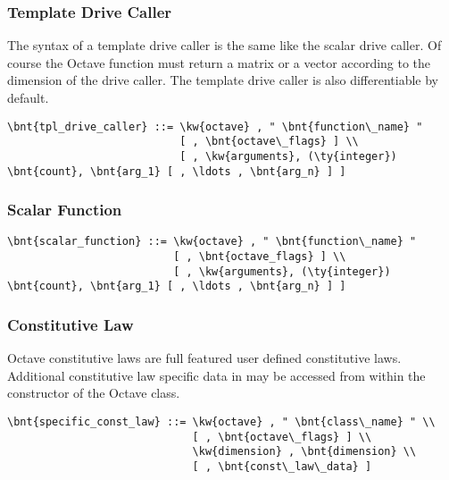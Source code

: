 \subsubsection{Template Drive Caller}
The syntax of a template drive caller is the same like the scalar drive caller. Of course the Octave function must return a matrix or a vector according to the dimension of the drive caller. The template drive caller is also differentiable by default.
\begin{Verbatim}[commandchars=\\\{\}]
    \bnt{tpl_drive_caller} ::= \kw{octave} , " \bnt{function\_name} "
                           [ , \bnt{octave\_flags} ] \\
                           [ , \kw{arguments}, (\ty{integer}) \bnt{count}, \bnt{arg_1} [ , \ldots , \bnt{arg_n} ] ]
\end{Verbatim}

\subsubsection{Scalar Function}
\begin{Verbatim}[commandchars=\\\{\}]
    \bnt{scalar_function} ::= \kw{octave} , " \bnt{function\_name} "
                          [ , \bnt{octave_flags} ] \\
                          [ , \kw{arguments}, (\ty{integer}) \bnt{count}, \bnt{arg_1} [ , \ldots , \bnt{arg_n} ] ]
\end{Verbatim}

\subsubsection{Constitutive Law}
Octave constitutive laws are full featured user defined constitutive laws.
Additional constitutive law specific data in  may be accessed from within the constructor of the Octave class.
\begin{Verbatim}[commandchars=\\\{\}]
    \bnt{specific_const_law} ::= \kw{octave} , " \bnt{class\_name} " \\
                             [ , \bnt{octave\_flags} ] \\
                             \kw{dimension} , \bnt{dimension} \\
                             [ , \bnt{const\_law\_data} ]
\end{Verbatim}

